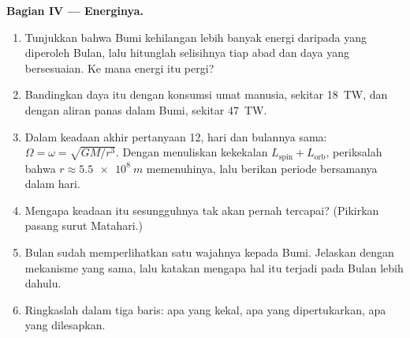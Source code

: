 \begin{problem}
\medskip
\noindent\textbf{Bagian IV --- Energinya.}
\begin{enumerate}[resume]
  \item Tunjukkan bahwa Bumi kehilangan lebih banyak energi daripada
        yang diperoleh Bulan, lalu hitunglah selisihnya tiap abad dan
        daya yang bersesuaian. Ke mana energi itu pergi?
  \item Bandingkan daya itu dengan konsumsi umat manusia, sekitar
        \qty{18}{TW}, dan dengan aliran panas dalam Bumi, sekitar
        \qty{47}{TW}.
  \item Dalam keadaan akhir pertanyaan 12, hari dan bulannya sama:
        $\Omega = \omega = \sqrt{GM/r^3}$. Dengan menuliskan kekekalan
        $L_{\text{spin}} + L_{\text{orb}}$, periksalah bahwa $r \approx
        \qty{5.5e8}{m}$ memenuhinya, lalu berikan periode bersamanya
        dalam hari.
  \item Mengapa keadaan itu sesungguhnya tak akan pernah tercapai?
        (Pikirkan pasang surut Matahari.)
  \item Bulan sudah memperlihatkan satu wajahnya kepada Bumi. Jelaskan
        dengan mekanisme yang sama, lalu katakan mengapa hal itu terjadi
        pada Bulan lebih dahulu.
  \item Ringkaslah dalam tiga baris: apa yang kekal, apa yang
        dipertukarkan, apa yang dilesapkan.
\end{enumerate}
\end{problem}
